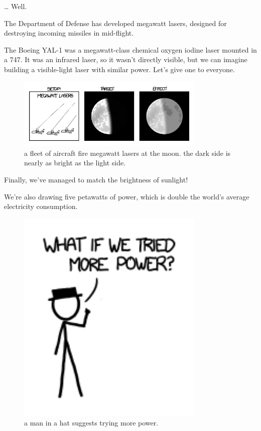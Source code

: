 {… Well.}

{The Department of Defense has developed megawatt lasers, designed for destroying incoming missiles in mid-flight.}

{The Boeing YAL-1 was a megawatt-class chemical oxygen iodine laser mounted in a 747. It was an infrared laser, so it wasn’t directly visible, but we can imagine building a visible-light laser with similar power. Let’s give one to everyone.}

\begin{figure}[!htbp]
\centering
\includegraphics[scale=0.5, max width=0.8\textwidth]{imgs/a/13/laser_pointer_megawatt.png}
\caption{a fleet of aircraft fire megawatt lasers at the moon. the dark side is nearly as bright as the light side.}
\end{figure}

{Finally, we’ve managed to match the brightness of sunlight!}

{We’re also drawing five petawatts of power, which is double the world’s average electricity consumption.}

\begin{figure}[!htbp]
\centering
\includegraphics[scale=0.5, max width=0.8\textwidth]{imgs/a/13/laser_pointer_more_power.png}
\caption{a man in a hat suggests trying more power.}
\end{figure}

